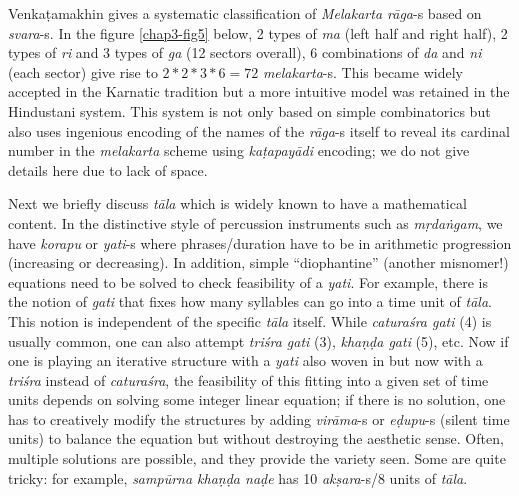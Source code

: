 Venkaṭamakhin gives a systematic classification of \textsl{Melakarta rāga}-s based on \textsl{svara}-s. In the figure \ref{chap3-fig5} below, 2 types of \textsl{ma} (left half and right half), 2 types of \textsl{ri} and 3 types of \textsl{ga} (12 sectors overall), 6 combinations of \textsl{da} and \textsl{ni} (each sector) give rise to $2*2*3*6=72$ \textsl{melakarta}-s. This became widely accepted in the Karnatic
 tradition but a more intuitive model was retained in the Hindustani system. This system is not only based on simple combinatorics but also uses ingenious encoding of the names of the \textsl{rāga}-s itself to reveal its cardinal number in the \textsl{melakarta} scheme using \textsl{kaṭapayādi} encoding; we do not give details here due to lack of space.

Next we briefly discuss \textsl{tāla} which is widely known to have a mathematical content. In the distinctive style of percussion instruments such as \textsl{mṛdaṅgam}, we have \textsl{korapu} or \textsl{yati}-s where phrases/duration have to be in arithmetic progression (increasing or decreasing). In addition, simple “diophantine” (another misnomer!) equations need to be solved to check feasibility of a \textsl{yati}. For example, there is the notion of \textsl{gati}
 that fixes how many syllables can go into a time unit of \textsl{tāla}. This notion is independent of the specific \textsl{tāla} itself. While \textsl{caturaśra gati} (4) is usually common, one can also attempt \textsl{triśra gati} (3), \textsl{khaṇḍa gati} (5), etc. Now if one is playing an iterative structure with a \textsl{yati} also woven in but now with a \textsl{triśra} instead of \textsl{caturaśra}, the feasibility of this fitting into a given set of time units depends on solving some integer linear equation; if there is no solution, one has to creatively modify the structures by adding \textsl{virāma}-s or \textsl{eḍupu}-s (silent time units) to balance the equation but without destroying the aesthetic sense. Often, multiple solutions are possible, and they provide the variety seen. Some are quite tricky: for example, \textsl{sampūrna khaṇḍa naḍe} has 10 \textsl{akṣara}-s/8 units of \textsl{tāla}.

